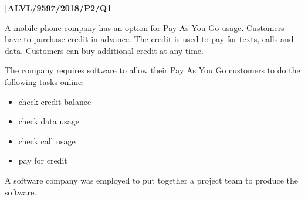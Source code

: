 \item \textbf{{[}ALVL/9597/2018/P2/Q1{]} }

A mobile phone company has an option for Pay As You Go usage. Customers
have to purchase credit in advance. The credit is used to pay for
texts, calls and data. Customers can buy additional credit at any
time. 

The company requires software to allow their Pay As You Go customers
to do the following tasks online: 
\begin{itemize}
\item check credit balance 
\item check data usage 
\item check call usage 
\item pay for credit 
\end{itemize}
A software company was employed to put together a project team to
produce the software. 
